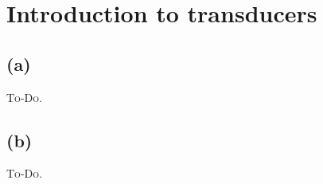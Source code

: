 



\section{Introduction to transducers}

\subsection{(a)}

\textsc{To-Do.}

\subsection{(b)}

\textsc{To-Do.}


